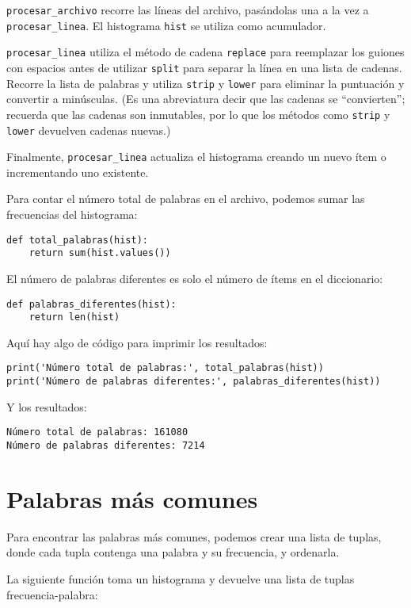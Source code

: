 \documentclass[10pt]{book}
\begin{document}
\verb"procesar_archivo" recorre las líneas del archivo,
pasándolas una a la vez a \verb"procesar_linea".  El histograma
{\tt hist} se utiliza como acumulador.

\verb"procesar_linea" utiliza el método de cadena {\tt replace} para reemplazar
los guiones con espacios antes de utilizar {\tt split} para separar la línea en una
lista de cadenas.  Recorre la lista de palabras y utiliza {\tt strip}
y {\tt lower} para eliminar la puntuación y convertir a minúsculas.  (Es
una abreviatura decir que las cadenas se ``convierten''; recuerda que
las cadenas son inmutables, por lo que los métodos como {\tt strip} y {\tt lower}
devuelven cadenas nuevas.)

Finalmente, \verb"procesar_linea" actualiza el histograma creando un nuevo
ítem o incrementando uno existente.

Para contar el número total de palabras en el archivo, podemos sumar
las frecuencias del histograma:

\begin{verbatim}
def total_palabras(hist):
    return sum(hist.values())
\end{verbatim}
%
El número de palabras diferentes es solo el número de ítems en
el diccionario:

\begin{verbatim}
def palabras_diferentes(hist):
    return len(hist)
\end{verbatim}
%
Aquí hay algo de código para imprimir los resultados:

\begin{verbatim}
print('Número total de palabras:', total_palabras(hist))
print('Número de palabras diferentes:', palabras_diferentes(hist))
\end{verbatim}
%
Y los resultados:

\begin{verbatim}
Número total de palabras: 161080
Número de palabras diferentes: 7214
\end{verbatim}
%

\section{Palabras más comunes}

Para encontrar las palabras más comunes, podemos crear una lista de tuplas,
donde cada tupla contenga una palabra y su frecuencia,
y ordenarla.

La siguiente función toma un histograma y devuelve una lista de
tuplas frecuencia-palabra:
\end{document}
